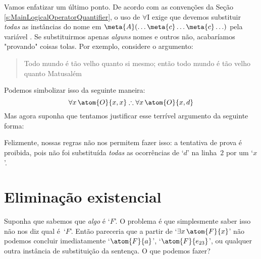 Vamos enfatizar um \'ultimo ponto. De acordo com as conven\c c\~oes da Se\c c\~ao \ref{s:MainLogicalOperatorQuantifier}, o uso de $\forall$I exige que devemos substituir  \emph{todas} as inst\^ancias do nome  em $\meta{A}(\ldots \meta{c}\ldots\meta{c}\ldots)$ pela vari\'avel . Se substituirmos apenas \emph{alguns} nomes e outros n\~ao, acabar\'iamos "provando" coisas tolas. Por exemplo, considere o argumento:
	\begin{quote}
	Todo mundo \'e t\~ao velho quanto si mesmo; ent\~ao todo mundo \'e t\~ao velho quanto Matusal\'em
	\end{quote}
Podemos simbolizar isso da seguinte maneira:
$$\forall x\,\atom{O}{x,x} \therefore \forall x\,\atom{O}{x,d}$$
Mas agora suponha que tentamos justificar esse terr\'ivel argumento da seguinte forma:
\begin{fitchproof}
\end{fitchproof}
Felizmente, nossas regras n\~ao nos permitem fazer isso: a tentativa de prova \'e proibida, pois n\~ao  foi substitu\'ida   \emph{todas} as ocorr\^encias de `$d$' na linha~$2$ por um `$x$'.

\section{Elimina\c c\~ao  existencial}
Suponha que sabemos que \emph{algo}  é `$F$'. O problema \'e que simplesmente saber isso n\~ao nos diz qual \'e~`$F$'. Ent\~ao pareceria que a partir de `$\exists x\,\atom{F}{x}$' n\~ao podemos concluir imediatamente `$\atom{F}{a}$', `$\atom{F}{e_{23}}$', ou qualquer outra inst\^ancia de substitui\c c\~ao da senten\c ca. O que podemos fazer?
 
